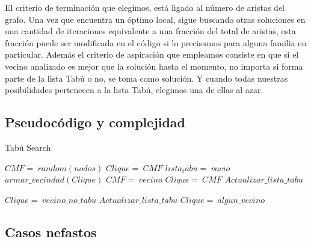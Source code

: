 El criterio de terminación que elegimos, está ligado al número de aristas del grafo. Una vez que encuentra un óptimo local, sigue buscando otras soluciones en una cantidad de iteraciones equivalente a una fracción del total de aristas, esta fracción puede ser modificada en el código si lo precisamos para alguna familia en particular.
Además el criterio de aspiración que empleamos consiste en que si el vecino analizado es mejor que la solución hasta el momento, no importa si forma parte de la lista Tabú o no, se toma como solución. Y cuando todas nuestras posibilidades pertenecen a la lista Tabú, elegimos una de ellas al azar.

\subsection{Pseudoc\'odigo y complejidad}
\begin{algorithm}
	\caption{Tabú Search}\label{tabu}
	\begin{algorithmic}[1]
		\State $CMF=\ random(nodos)$	
		\State $Clique=\ CMF$
		\State $lista_tabu=\ vacio$
			\State $armar\_vecindad(Clique)$
				 
					\State $CMF=\ vecino$
					\State $Clique=\ CMF$ 
					\State $Actualizar\_lista\_tabu$
				\EndIf
			\EndFor
		\EndWhile

				\State $Clique=\ vecino\_no\_tabu$
				\State $Actualizar\_lista\_tabu$
			\Else
				\State $Clique=\ algun\_vecino$
			\EndIf
		\EndIf
	\EndProcedure
\end{algorithmic}
\end{algorithm}


\subsection{Casos nefastos}






